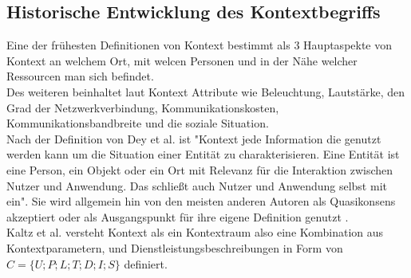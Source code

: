 \subsection{Historische Entwicklung des Kontextbegriffs}


Eine der frühesten Definitionen von Kontext \cite{schilit_context-aware_1994} bestimmt als 3 Hauptaspekte von Kontext an welchem Ort, mit welcen Personen und in der Nähe welcher Ressourcen man sich befindet.\\
Des weiteren beinhaltet laut  \cite{schilit_context-aware_1994} Kontext Attribute wie Beleuchtung, Lautstärke, den Grad der Netzwerkverbindung, Kommunikationskosten, Kommunikationsbandbreite und die soziale Situation.\\
Nach der Definition von Dey et al. \cite{dey_understanding_2001} ist "Kontext jede Information die genutzt werden kann um die Situation einer Entität zu charakterisieren. Eine Entität ist eine Person, ein Objekt oder ein Ort mit Relevanz für die Interaktion zwischen Nutzer und Anwendung. Das schließt auch Nutzer und Anwendung selbst mit ein".
Sie wird allgemein hin von den meisten anderen Autoren als Quasikonsens akzeptiert \cite{wei_liu_survey_2011,alegre_engineering_2016,aguilar_cameonto_2018} oder als Ausgangspunkt für ihre eigene Definition genutzt \cite{kokinov_operational_2007,kayes_icaf_2012}.\\
Kaltz et al. \cite{wolfgang_kaltz_context-aware_2005} versteht Kontext als ein Kontextraum also eine Kombination aus Kontextparametern, %
 und Dienstleistungsbeschreibungen in Form von $C = \{U;P;L;T;D;I;S\}$ definiert.
